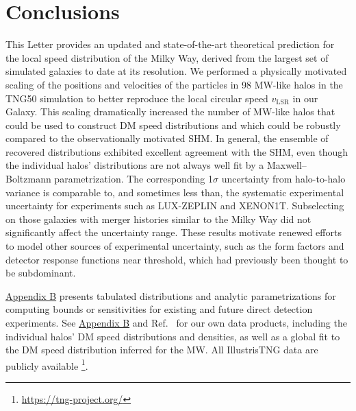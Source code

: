\documentclass[aps,prl,reprint,superscriptaddress,nopreprintnumbers,nobibnotes,floatfix,longbibliography,footinbib]{revtex4-2}
\newcommand{\Illustris}{Illustris}
\newcommand{\TNG}{TNG}
\newcommand{\TNGfifty}{TNG50}
\newcommand{\vLSR}{\ensuremath{v_\mathrm{\scriptscriptstyle LSR}}}
\begin{document}
\section{Conclusions}
\label{sec:concl}
This Letter provides an updated and state-of-the-art theoretical prediction for the local speed distribution of the Milky Way, derived from the largest set of simulated galaxies to date at its resolution. We performed a physically motivated scaling of the positions and velocities of the particles in 98 MW-like halos in the \TNGfifty{} simulation to better reproduce the local circular speed \vLSR{} in our Galaxy. This scaling dramatically increased the number of MW-like halos that could be used to construct DM speed distributions and which could be robustly compared to the observationally motivated SHM. 
In general, the ensemble of recovered distributions exhibited excellent agreement with the SHM, even though the individual halos' distributions are not always well fit by a Maxwell--Boltzmann parametrization.
The corresponding 1$\sigma$ uncertainty from halo-to-halo variance is comparable to, and sometimes less than, the systematic experimental uncertainty for experiments such as LUX-ZEPLIN and XENON1T. Subselecting on those galaxies with merger histories similar to the Milky Way did not significantly affect the uncertainty range. These results motivate renewed efforts to model other sources of experimental uncertainty, such as the form factors and detector response functions near threshold, which had previously been thought to be subdominant. 

\hyperref[app:B]{Appendix B} presents tabulated distributions and analytic parametrizations for computing bounds or sensitivities for existing and future direct detection experiments. 
See \hyperref[app:B]{Appendix B} and Ref.~\cite{data_release} for our own data products, including the individual halos' DM speed distributions and densities, as well as a global fit to the DM speed distribution inferred for the MW. All \Illustris\TNG{} data are publicly available \footnote{\href{https://tng-project.org/}{https://tng-project.org/}}.

\vspace{\baselineskip}
\end{document}
